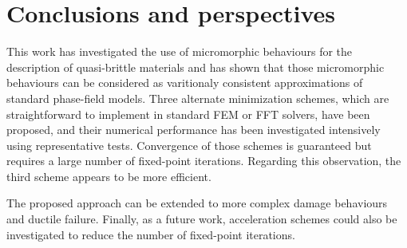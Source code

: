 \section{Conclusions and perspectives}

This work has investigated the use of micromorphic behaviours for the
description of quasi-brittle materials and has shown that those
micromorphic behaviours can be considered as varitionaly consistent
approximations of standard phase-field models.
%
%
%
Three alternate minimization schemes, which are straightforward to
implement in standard FEM or FFT solvers, have been proposed, and their numerical performance has been investigated intensively using representative tests. 
%
%
%
Convergence of those schemes is guaranteed but requires a large number
of fixed-point iterations. Regarding this observation, the third
scheme appears to be more efficient.

The proposed approach can be extended to more complex damage behaviours
and ductile failure.
%
%
%
Finally, as a future work, acceleration schemes could also be
investigated to reduce the number of fixed-point iterations.
